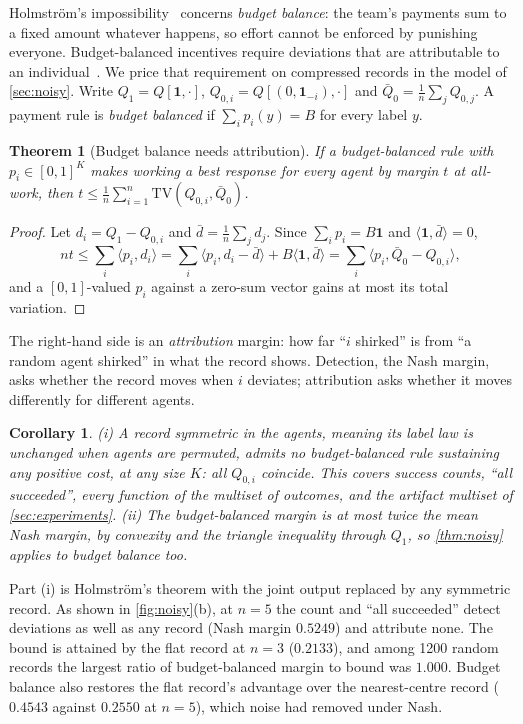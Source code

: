 \documentclass[sigconf,anonymous,acmthm=false]{acmart}
\theoremstyle{acmplain}
\newtheorem{theorem}{Theorem}
\newtheorem{corollary}{Corollary}
\theoremstyle{acmdefinition}
\newcommand{\TV}{\mathrm{TV}}
\begin{document}
Holmstr\"om's impossibility~\cite{holmstrom1982teams} concerns \emph{budget balance}: the
team's payments sum to a fixed amount whatever happens, so effort cannot be enforced by
punishing everyone. Budget-balanced incentives require deviations that are attributable to
an individual~\cite{legrosmatthews1993,rahmanobara2010}. We price that requirement on
compressed records in the model of \cref{sec:noisy}. Write $Q_1=Q[\mathbf1,\cdot]$,
$Q_{0,i}=Q[(0,\mathbf1_{-i}),\cdot]$ and $\bar Q_0=\frac1n\sum_jQ_{0,j}$. A payment rule is
\emph{budget balanced} if $\sum_ip_i(y)=B$ for every label $y$.

\begin{theorem}[Budget balance needs attribution]\label{thm:bb}
If a budget-balanced rule with $p_i\in[0,1]^K$ makes working a best response for every agent
by margin $t$ at all-work, then $t\le\frac1n\sum_{i=1}^n\TV(Q_{0,i},\bar Q_0)$.
\end{theorem}

\begin{proof}
Let $d_i=Q_1-Q_{0,i}$ and $\bar d=\frac1n\sum_jd_j$. Since $\sum_ip_i=B\mathbf1$ and
$\langle\mathbf1,\bar d\rangle=0$,
\[ nt\le\sum_i\langle p_i,d_i\rangle=\sum_i\langle p_i,d_i-\bar d\rangle+B\langle\mathbf1,\bar d\rangle=\sum_i\langle p_i,\bar Q_0-Q_{0,i}\rangle, \]
and a $[0,1]$-valued $p_i$ against a zero-sum vector gains at most its total variation.
\end{proof}

The right-hand side is an \emph{attribution} margin: how far ``$i$ shirked'' is from ``a
random agent shirked'' in what the record shows. Detection, the Nash margin, asks whether
the record moves when $i$ deviates; attribution asks whether it moves differently for
different agents.

\begin{corollary}\label{cor:bb}
(i) A record symmetric in the agents, meaning its label law is unchanged when agents are
permuted, admits no budget-balanced rule sustaining any positive cost, at any size $K$: all
$Q_{0,i}$ coincide. This covers success counts, ``all succeeded'', every function of the
multiset of outcomes, and the artifact multiset of \cref{sec:experiments}. (ii) The
budget-balanced margin is at most twice the mean Nash margin, by convexity and the triangle
inequality through $Q_1$, so \cref{thm:noisy} applies to budget balance too.
\end{corollary}

Part (i) is Holmstr\"om's theorem with the joint output replaced by any symmetric record. As
shown in \cref{fig:noisy}(b), at $n=5$ the count and ``all succeeded'' detect deviations as
well as any record (Nash margin $0.5249$) and attribute none. The bound is attained by the
flat record at $n=3$ ($0.2133$), and among 1200 random records the largest ratio of
budget-balanced margin to bound was $1.000$. Budget balance also restores the flat record's
advantage over the nearest-centre record ($0.4543$ against $0.2550$ at $n=5$), which noise
had removed under Nash.
\end{document}
